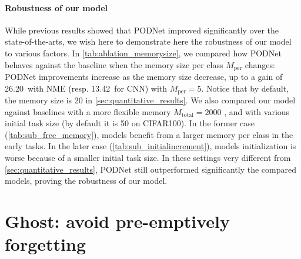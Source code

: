 \label{sec:robustness}
\paragraph{Robustness of our model} While previous results showed that PODNet improved significantly
over the state-of-the-arts, we wish here to demonstrate here the robustness of our model to various
factors. In \autoref{tab:ablation_memorysize}, we compared how PODNet behaves against the baseline
when the memory size per class $M_{\text{per}}$ changes: PODNet improvements increase as the memory
size decrease, up to a gain of 26.20\pp\ with NME (resp. 13.42\pp\ for CNN) with $M_{\text{per}} =
    5$. Notice that by default, the memory size is 20 in \autoref{sec:quantitative_results}.
We also compared our model against baselines with a more flexible memory $M_{\text{total}} = 2000$
\citep{rebuffi2017icarl,wu2019bias_correction}, and with various initial task size (by default it is
50 on CIFAR100). In the former case (\autoref{tab:sub_free_memory}), models benefit from a larger
memory per class in the early tasks. In the later case (\autoref{tab:sub_initialincrement}), models
initialization is worse because of a smaller initial task size. In these settings very different
from \autoref{sec:quantitative_results}, PODNet still outperformed significantly the compared
models, proving the robustness of our model.





\section{Ghost: avoid pre-emptively forgetting}

